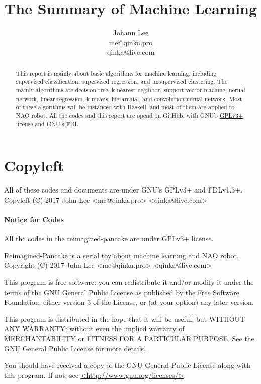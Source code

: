 \documentclass{article}
\title{The Summary of Machine Learning}
\author{Johann Lee \\  me@qinka.pro \\ qinka@live.com}
\begin{document}
\maketitle
\begin{abstract}
  This report is mainly about basic algorithms for machine learning,
  including supervised classification, supervised regression, and unsupervised clustering.
  The mainly algorithms are decision tree, k-nearest negihbor, support vector machine, nerual network,
  linear-regression, k-means, hierarchial, and convolution nerual network.
  Most of these algorithms will be instanced with Haskell, and most of them are applied to NAO robot.
  All the codes and this report are opend on GitHub, with GNU's
  \href{https://www.gnu.org/copyleft/gpl.html}{GPLv3+} license and GNU's
  \href{https://www.gnu.org/licenses/quick-guide-gplv3.html}{FDL}.
\end{abstract}
\section*{Copyleft}
\label{sec:copyleft}

All of these codes and documents are under GNU's GPLv3+ and FDLv1.3+. \\
{\large Copyleft (C) 2017 John Lee <me@qinka.pro> <qinka@live.com>} \\

\paragraph{Notice for Codes}

All the codes in the reimagined-pancake are under GPLv3+ license.

Reimagined-Pancake is a serial toy about machine learning and NAO robot.
Copyright (C) 2017 John Lee <me@qinka.pro> <qinka@live.com>

This program is free software: you can redistribute it and/or modify
it under the terms of the GNU General Public License as published by
the Free Software Foundation, either version 3 of the License, or
(at your option) any later version.

This program is distributed in the hope that it will be useful,
but WITHOUT ANY WARRANTY; without even the implied warranty of
MERCHANTABILITY or FITNESS FOR A PARTICULAR PURPOSE.  See the
GNU General Public License for more details.

You should have received a copy of the GNU General Public License
along with this program.  If not, see \href{http://www.gnu.org/licenses}{<http://www.gnu.org/licenses/>}.
\end{document}
